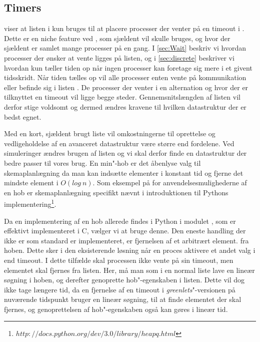 \subsection{Timers}  
 viser at listen  i \pycsp kun bruges til at placere processer der venter på en timeout i . Dette er en niche feature ved \pycsp, som  sjældent vil skulle bruges, og hvor der sjældent er samlet mange processer på en gang. 
 I \cref{sec:Wait} beskriv vi hvordan processer der ønsker at vente ligges på  listen, og i \cref{sec:discrete} beskriver vi hvordan \sched kun tæller tiden op når ingen processer kan foretage sig mere i et givent tidsskridt. Når tiden tælles op vil  alle processer enten vente på kommunikation eller befinde sig i listen . De processer der venter i en alternation og hvor der er tilknyttet en timeout vil ligge begge steder. Gennemsnitslængden af listen vil derfor stige voldsomt og dermed ændres kravene til hvilken  datastruktur der er bedst egnet. 
 
Med en kort, sjældent brugt liste vil omkostningerne til oprettelse og vedligeholdelse af en avanceret datastruktur være større end fordelene. Ved simuleringer ændres brugen af listen og vi skal derfor finde en datastruktur der bedre passer til vores brug. En min"-hob er det åbenlyse valg til skemaplanlægning da  man kan  indsætte elementer i konstant tid og fjerne det mindste element i $O(log\ n)$. Som eksempel på for anvendelsesmulighederne af en hob er skemaplanlægning specifikt nævnt i introduktionen til Pythons implementering\footnote{$http://docs.python.org/dev/3.0/library/heapq.html$}.  

Da en implementering af en hob allerede findes i Python i modulet , som er effektivt implementeret i C, vælger vi at bruge denne. Den eneste handling
der ikke er som standard er implementeret, er fjernelsen af et arbitrært element.
fra hoben. Dette sker i den eksisterende løsning når en proces
aktivere et andet valg i  end timeout. I dette tilfælde skal
processen ikke vente på sin timeout, men elementet skal fjernes fra
 listen. Her, må man som i
en normal liste lave en lineær søgning i hoben, og derefter genoprette
hob"-egenskaben i listen. Dette vil dog ikke tage længere tid, da en fjernelse af en timeout i \emph{greenlets}"-versionen på nuværende
tidspunkt bruger en lineær søgning, til at finde elementet der skal
fjernes, og genoprettelsen af hob"-egenskaben også kan gøres i lineær tid.

